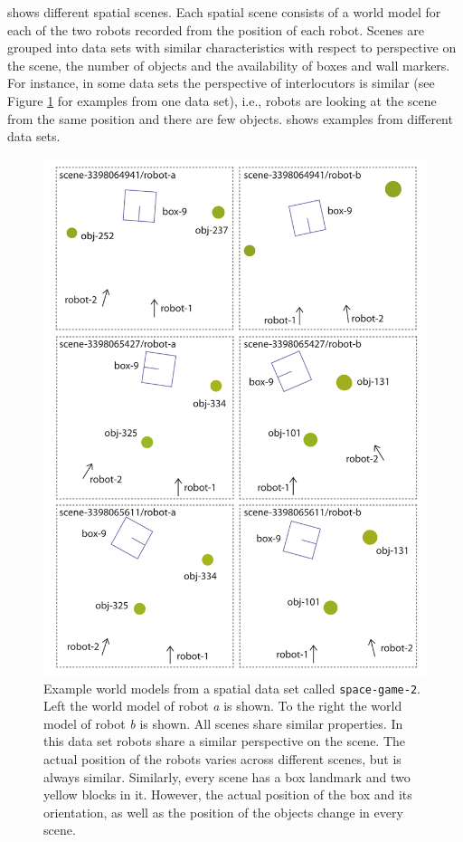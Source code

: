  shows different spatial scenes. Each spatial scene 
consists of a world model for each of the two robots recorded from the position of 
each robot. Scenes are grouped into data sets with similar characteristics
with respect to perspective on the scene, the number of objects and
the availability of boxes and wall markers. For instance, in some data sets the perspective of interlocutors is similar (see Figure \ref{f:spatial-scenes-1} for 
examples from one data set), i.e., robots
are looking at the scene from the same position and there are few objects.
 shows examples from different data sets.

\begin{figure}
\begin{center}
\includegraphics[width=.8\textwidth]{figs/spatial-scenes-overview-1}
\end{center}
\caption[Example world models]{Example world models from a spatial data
set called {\tt\footnotesize space-game-2}. Left the world model of 
robot \emph{a} is shown. To the right the world model of robot 
\emph{b} is shown. All scenes share similar properties. In 
this data set robots share a similar perspective on the scene.
The actual position of the robots varies across different scenes, but is always similar.
Similarly, every scene has a box landmark and two yellow blocks in it. 
However, the actual position of the box and its orientation, as well as the
position of the objects change in every scene.}
\label{f:spatial-scenes-1}
\end{figure}


